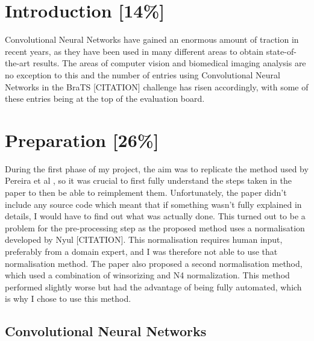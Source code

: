 \documentclass[12pt,a4paper,twoside,openright]{report}
\begin{document}

\pagestyle{headings}

\chapter{Introduction [14\%]}
Convolutional Neural Networks have gained an enormous amount of traction in recent years, as they have been used in many different areas to obtain state-of-the-art results. The areas of computer vision and biomedical imaging analysis are no exception to this and the number of entries using Convolutional Neural Networks in the BraTS [CITATION] challenge has risen accordingly, with some of these entries being at the top of the evaluation board.

\chapter{Preparation [26\%]}
During the first phase of my project, the aim was to replicate the method used by Pereira et al \cite{pereira}, so it was crucial to first fully understand the steps taken in the paper to then be able to reimplement them. Unfortunately, the paper didn't include any source code which meant that if something wasn't fully explained in details, I would have to find out what was actually done. This turned out to be a problem for the pre-processing step as the proposed method uses a normalisation developed by Nyul [CITATION]. This normalisation requires human input, preferably from a domain expert, and I was therefore not able to use that normalisation method. The paper also proposed a second normalisation method, which used a combination of winsorizing and N4 normalization. This method performed slightly worse but had the advantage of being fully automated, which is why I chose to use this method.\\

\section{Convolutional Neural Networks}
\end{document}
